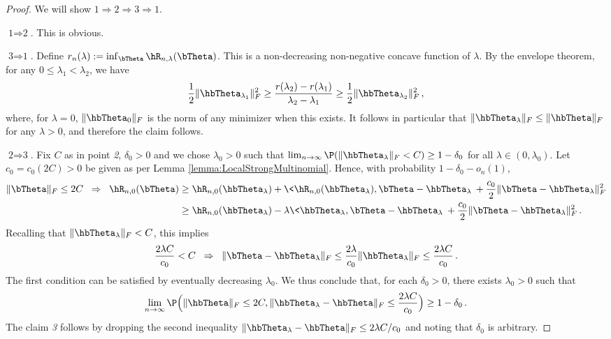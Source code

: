 \begin{proof}
We will show $\textit{1}\Rightarrow \textit{2}\Rightarrow \textit{3} \Rightarrow \textit{1}$. 

\vspace{0.15cm}

\noindent $\textit{1}\Rightarrow \textit{2}$. This is obvious.

\vspace{0.15cm}

\noindent $\textit{3}\Rightarrow \textit{1}$. Define $r_n(\lambda) := \inf_{\bTheta}\hR_{n,\lambda}(\bTheta)$.
This is a non-decreasing non-negative concave function of $\lambda$. By the envelope theorem, for any
$0\le \lambda_1<\lambda_2$, we have 
%
\begin{align}
\frac{1}{2}\|\hbTheta_{\lambda_1}\|^2_F \ge \frac{r(\lambda_2)-r(\lambda_1)}{\lambda_2-\lambda_1} \ge \frac{1}{2}\|\hbTheta_{\lambda_2}\|^2_F\, ,
\end{align}
%
where, for $\lambda=0$, $\|\hbTheta_{0}\|_F$ is the norm of any minimizer when this exists.
It follows in particular that $\|\hbTheta_{\lambda}\|_F\le \|\hbTheta\|_F$ for any $\lambda>0$, and therefore the claim follows. 

\vspace{0.15cm}

\noindent $\textit{2}\Rightarrow \textit{3}$. Fix $C$ as in point \textit{2}, $\delta_0>0$ and we chose $\lambda_0>0$
such that
$\lim_{n\to\infty}\P(\|\hbTheta_{\lambda}\|_F<C)\ge 1-\delta_0$ for all $\lambda\in(0,\lambda_0)$. Let $c_0 = c_0(2C)>0$
be given as per Lemma \ref{lemma:LocalStrongMultinomial}. Hence, with probability $1-\delta_0-o_n(1)$,
%
\begin{align}
\|\bTheta\|_F\le 2C \;\;\Rightarrow\;\;
\hR_{n,0}(\bTheta)&\ge \hR_{n,0}(\hbTheta_{\lambda}) +\< \hR_{n,0}(\hbTheta_{\lambda}),\bTheta-\hbTheta_{\lambda}\>
+\frac{c_0}{2}\|\bTheta-\hbTheta_{\lambda}\|_F^2\\
&\ge \hR_{n,0}(\hbTheta_{\lambda}) -\lambda\< \hbTheta_{\lambda},\bTheta-\hbTheta_{\lambda}\>
+\frac{c_0}{2}\|\bTheta-\hbTheta_{\lambda}\|_F^2\, .
\end{align}
%
Recalling that $\|\hbTheta_{\lambda}\|_F<C$, this implies
%
\begin{align}
\frac{2\lambda C}{c_0}<C \;\;\Rightarrow \;\; \|\bTheta-\hbTheta_{\lambda}\|_F\le \frac{2\lambda}{c_0}\|\hbTheta_{\lambda}\|_F\le \frac{2\lambda C}{c_0}\, .
\end{align}
%
The first condition can be satisfied by eventually decreasing $\lambda_0$. We thus conclude that, for each 
$\delta_0>0$, there exists $\lambda_0>0$ such that 
%
\begin{align}
\lim_{n\to\infty}\P\Big(\|\hbTheta\|_F\le 2C, \|\hbTheta_{\lambda}-\hbTheta\|_F\le \frac{2\lambda C}{c_0}\Big)\ge 1-\delta_0\, .
\end{align}
%
The claim \textit{3} follows by dropping the second inequality
 $\|\hbTheta_{\lambda}-\hbTheta\|_F\le 2\lambda C/c_0$ and noting that $\delta_0$ is arbitrary.


\end{proof}
